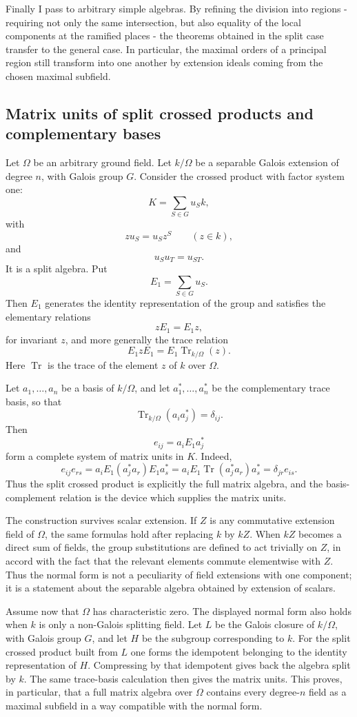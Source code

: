 \documentclass[12pt]{article}
\begin{document}
Finally I pass to arbitrary simple algebras. By refining the division into regions - requiring not only the same intersection, but also equality of the local components at the ramified places - the theorems obtained in the split case transfer to the general case. In particular, the maximal orders of a principal region still transform into one another by extension ideals coming from the chosen maximal subfield.

\subsection{Matrix units of split crossed products and complementary bases}

Let \(\Omega\) be an arbitrary ground field. Let \(k/\Omega\) be a separable Galois extension of degree \(n\), with Galois group \(G\). Consider the crossed product with factor system one:
\[
  K=\sum_{S\in G} u_S k,
\]
with
\[
  z u_S=u_S z^S\qquad(z\in k),
\]
and
\[
  u_Su_T=u_{ST}.
\]
It is a split algebra. Put
\[
  E_1=\sum_{S\in G} u_S .
\]
Then \(E_1\) generates the identity representation of the group and satisfies the elementary relations
\[
  zE_1=E_1 z,
\]
for invariant \(z\), and more generally the trace relation
\[
  E_1 z E_1=E_1\operatorname{Tr}_{k/\Omega}(z).
\]
Here \(\operatorname{Tr}\) is the trace of the element \(z\) of \(k\) over \(\Omega\).

Let \(a_1,\ldots,a_n\) be a basis of \(k/\Omega\), and let \(a_1^*,\ldots,a_n^*\) be the complementary trace basis, so that
\[
  \operatorname{Tr}_{k/\Omega}(a_i a_j^*)=\delta_{ij}.
\]
Then
\[
  e_{ij}=a_i E_1 a_j^*
\]
form a complete system of matrix units in \(K\). Indeed,
\[
  e_{ij}e_{rs}=a_iE_1(a_j^*a_r)E_1a_s^*
  =a_iE_1\operatorname{Tr}(a_j^*a_r)a_s^*
  =\delta_{jr}e_{is}.
\]
Thus the split crossed product is explicitly the full matrix algebra, and the basis-complement relation is the device which supplies the matrix units.

The construction survives scalar extension. If \(Z\) is any commutative extension field of \(\Omega\), the same formulas hold after replacing \(k\) by \(kZ\). When \(kZ\) becomes a direct sum of fields, the group substitutions are defined to act trivially on \(Z\), in accord with the fact that the relevant elements commute elementwise with \(Z\). Thus the normal form is not a peculiarity of field extensions with one component; it is a statement about the separable algebra obtained by extension of scalars.

Assume now that \(\Omega\) has characteristic zero. The displayed normal form also holds when \(k\) is only a non-Galois splitting field. Let \(L\) be the Galois closure of \(k/\Omega\), with Galois group \(G\), and let \(H\) be the subgroup corresponding to \(k\). For the split crossed product built from \(L\) one forms the idempotent belonging to the identity representation of \(H\). Compressing by that idempotent gives back the algebra split by \(k\). The same trace-basis calculation then gives the matrix units. This proves, in particular, that a full matrix algebra over \(\Omega\) contains every degree-\(n\) field as a maximal subfield in a way compatible with the normal form.
\end{document}

